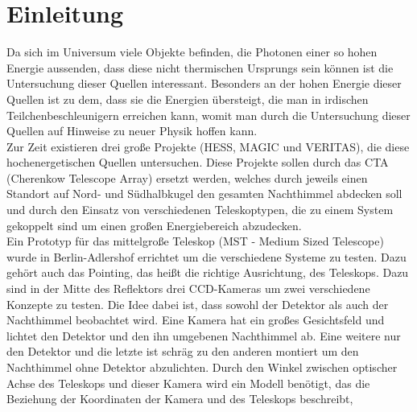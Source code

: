 \chapter{Einleitung}
Da sich im Universum viele Objekte befinden, die Photonen einer so hohen Energie aussenden, dass diese nicht thermischen Ursprungs sein können ist die Untersuchung dieser Quellen interessant. Besonders an der hohen Energie dieser Quellen ist zu dem, dass sie die Energien übersteigt, die man in irdischen Teilchenbeschleunigern erreichen kann, womit man durch die Untersuchung dieser Quellen auf Hinweise zu neuer Physik hoffen kann.\\
Zur Zeit existieren drei große Projekte (HESS, MAGIC und VERITAS), die diese hochenergetischen Quellen untersuchen. Diese Projekte sollen durch das CTA (Cherenkow Telescope Array) ersetzt werden, welches durch jeweils einen Standort auf Nord- und Südhalbkugel den gesamten Nachthimmel abdecken soll und durch den Einsatz von verschiedenen Teleskoptypen, die zu einem System gekoppelt sind um einen großen Energiebereich abzudecken.\\
Ein Prototyp für das mittelgroße Teleskop (MST - Medium Sized Telescope) wurde in Berlin-Adlershof errichtet um die verschiedene Systeme zu testen. Dazu gehört auch das Pointing, das heißt die richtige Ausrichtung, des Teleskops. Dazu sind in der Mitte des Reflektors drei CCD-Kameras um zwei verschiedene Konzepte zu testen. Die Idee dabei ist, dass sowohl der Detektor als auch der Nachthimmel beobachtet wird. Eine Kamera hat ein großes Gesichtsfeld und lichtet den Detektor und den ihn umgebenen Nachthimmel ab. Eine weitere nur den Detektor und die letzte ist schräg zu den anderen montiert um den Nachthimmel ohne Detektor abzulichten. Durch den Winkel zwischen optischer Achse des Teleskops und dieser Kamera wird ein Modell benötigt, das die Beziehung der Koordinaten der Kamera und des Teleskops beschreibt,